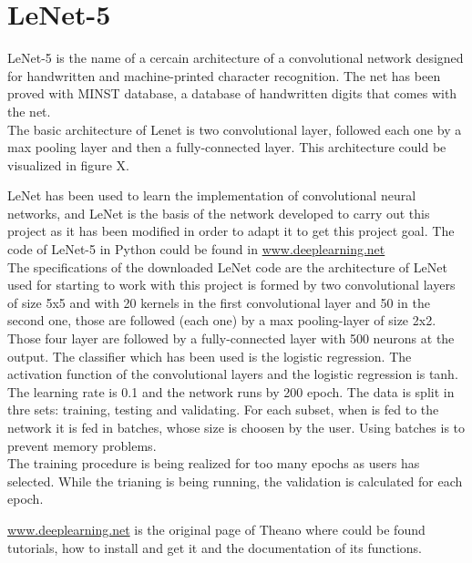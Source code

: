 \section{LeNet-5}
LeNet-5 \cite{Lenet5} is the name of a cercain architecture of a convolutional network designed for handwritten and machine-printed character recognition. The net has been proved with MINST database, a database of handwritten digits that comes with the net.\\


The basic architecture of Lenet is two convolutional layer, followed each one by a max pooling layer and then a fully-connected layer. This architecture could be visualized in figure X.

LeNet has been used to learn the implementation of convolutional neural networks, and LeNet is the basis of the network developed to carry out this project as it has been modified in order to adapt it to get this project goal. The code of LeNet-5 in Python could be found in \url{www.deeplearning.net}\\

The specifications of the downloaded LeNet code are the architecture of LeNet used for starting to work with this project is formed by two convolutional layers of size 5x5 and with 20 kernels in the first convolutional layer and 50 in the second one, those are followed (each one) by a max pooling-layer of size 2x2. Those four layer are followed by a fully-connected layer with 500 neurons at the output. The classifier which has been used is the logistic regression. The activation function of the convolutional layers and the logistic regression is tanh.\\

The learning rate is 0.1 and the network runs by 200 epoch. The data is split in thre sets: training, testing and validating. For each subset, when is fed to the network it is fed in batches, whose size is choosen by the user. Using batches is to prevent memory problems.\\

The training procedure is being realized for too many epochs as users has selected. While the trianing is being running, the validation is calculated for each epoch.

\url{www.deeplearning.net} is the original page of Theano where could be found tutorials, how to install and get it and the documentation of its functions.\\


